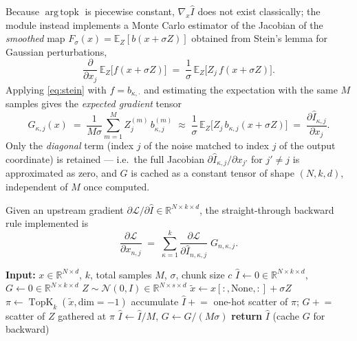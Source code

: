 \documentclass[stu,floatsintext]{apa7}
\newcommand{\R}{\mathbb{R}}
\newcommand{\TopK}{\operatorname{TopK}}
\DeclareMathOperator*{\argtopk}{arg\,topk}
\begin{document}
Because $\argtopk$ is piecewise constant, $\nabla_x \hat I$ does not exist classically; the module instead
implements a Monte Carlo estimator of the Jacobian of the \emph{smoothed} map $F_\sigma(x)=\mathbb E_Z[b(x+\sigma
Z)]$ obtained from Stein's lemma for Gaussian perturbations,
\begin{equation}
  \label{eq:stein}
  \frac{\partial}{\partial x_j}\,\mathbb E_Z\bigl[f(x+\sigma Z)\bigr]
  \;=\; \frac{1}{\sigma}\,\mathbb E_Z\bigl[Z_j\, f(x+\sigma Z)\bigr].
\end{equation}
Applying \eqref{eq:stein} with $f=b_{\kappa,\cdot}$ and estimating the expectation with the same $M$
samples gives the \emph{expected gradient} tensor
\begin{equation}
  \label{eq:topk-grad}
  G_{\kappa,j}(x) \;=\; \frac{1}{M\sigma}\sum_{m=1}^{M} Z^{(m)}_{j}\, b^{(m)}_{\kappa,j}
  \;\approx\; \frac{1}{\sigma}\,\mathbb E_Z\bigl[Z_j\, b_{\kappa,j}(x+\sigma Z)\bigr]
  \;=\; \frac{\partial \hat I_{\kappa,j}}{\partial x_j}.
\end{equation}
Only the \emph{diagonal} term (index $j$ of the noise matched to index $j$ of the output coordinate) is
retained — i.e.\ the full Jacobian $\partial \hat I_{\kappa,j}/\partial x_{j'}$ for $j'\neq j$ is
approximated as zero, and $G$ is cached as a constant tensor of shape $(N,k,d)$, independent of $M$ once
computed.

Given an upstream gradient $\partial \mathcal L/\partial \hat I \in \R^{N\times k\times d}$, the
straight-through backward rule implemented is
\begin{equation}
  \label{eq:topk-back}
  \frac{\partial \mathcal L}{\partial x_{n,j}}
  \;=\; \sum_{\kappa=1}^{k} \frac{\partial \mathcal L}{\partial \hat I_{n,\kappa,j}}\; G_{n,\kappa,j}.
\end{equation}

\begin{algorithm}[h]
\caption{Perturbed Top-K forward pass (per chunk)}
\begin{algorithmic}[1]
\State \textbf{Input:} $x\in\R^{N\times d}$, $k$, total samples $M$, $\sigma$, chunk size $c$
\State $\hat I \gets 0 \in \R^{N\times k\times d}$, \quad $G \gets 0\in\R^{N\times k\times d}$
  \State $Z \sim \mathcal N(0,I)\in \R^{N\times s\times d}$
  \State $\tilde x \gets x[:,\text{None},:] + \sigma Z$
  \State $\pi \gets \TopK_k(\tilde x,\text{dim}=-1)$ 
  \State accumulate $\hat I \mathrel{+}= $ one-hot scatter of $\pi$; \quad $G \mathrel{+}= $ scatter of $Z$ gathered at $\pi$
\EndFor
\State $\hat I \gets \hat I / M$, \qquad $G \gets G/(M\sigma)$
\State \textbf{return} $\hat I$ \quad (cache $G$ for backward)
\end{algorithmic}
\end{algorithm}
\end{document}
